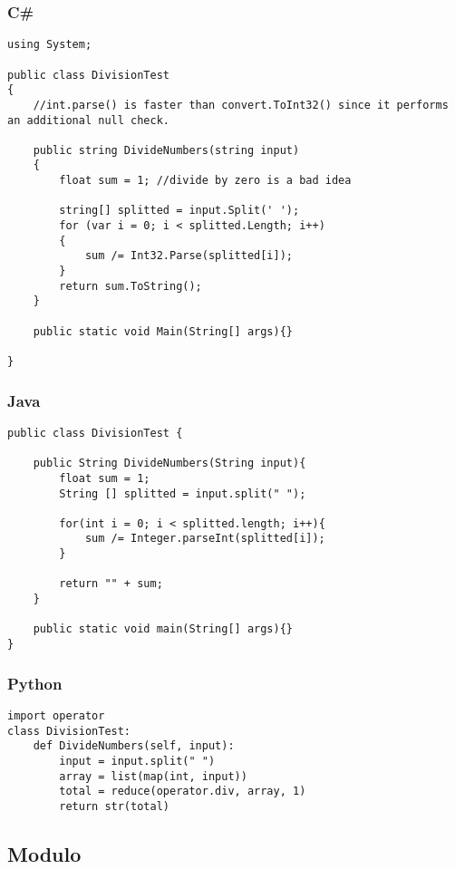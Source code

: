 \subsubsection{C\#}
\lstset{style=sharpc}
\begin{lstlisting}
using System;

public class DivisionTest
{
    //int.parse() is faster than convert.ToInt32() since it performs an additional null check.

    public string DivideNumbers(string input)
    {
        float sum = 1; //divide by zero is a bad idea

        string[] splitted = input.Split(' ');
        for (var i = 0; i < splitted.Length; i++)
        {
            sum /= Int32.Parse(splitted[i]);
        }
        return sum.ToString();
    }

	public static void Main(String[] args){}

}

\end{lstlisting}


\subsubsection{Java}
\lstset{style=java}
\begin{lstlisting}
public class DivisionTest {

	public String DivideNumbers(String input){
		float sum = 1;
		String [] splitted = input.split(" ");

		for(int i = 0; i < splitted.length; i++){
			sum /= Integer.parseInt(splitted[i]);
		}

		return "" + sum;
	}

	public static void main(String[] args){}
}
\end{lstlisting}




\subsubsection{Python}
\lstset{style=python}
\begin{lstlisting}
import operator
class DivisionTest:
    def DivideNumbers(self, input):
        input = input.split(" ")
        array = list(map(int, input))
        total = reduce(operator.div, array, 1)
        return str(total)
\end{lstlisting}




\subsection{Modulo}


